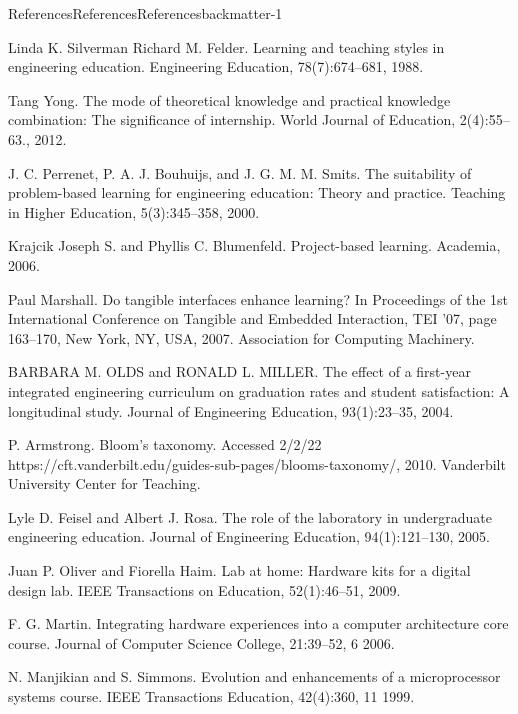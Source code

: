 \documentclass[oneside,10pt,]{book}
\numberwithin{equation}{section}
\begin{document}
\begin{references-chapter-numberless}{References}{References}{}{References}{}{}{backmatter-1}
\begin{referencelist}
\hypertarget{Learning-Styles}{}Linda K. Silverman Richard M. Felder. Learning and teaching styles in engineering education. Engineering Education, 78(7):674–681, 1988.%

\hypertarget{Yong}{}Tang Yong. The mode of theoretical knowledge and practical knowledge combination: The significance of internship. World Journal of Education, 2(4):55–63., 2012.%

\hypertarget{PBL1}{}J. C. Perrenet, P. A. J. Bouhuijs, and J. G. M. M. Smits. The suitability of problem-based learning for engineering education: Theory and practice. Teaching in Higher Education, 5(3):345–358, 2000.%

\hypertarget{PBL-Book}{}Krajcik Joseph S. and Phyllis C. Blumenfeld. Project-based learning. Academia, 2006.%

\hypertarget{TANGIBLEINTERFACES}{}Paul Marshall. Do tangible interfaces enhance learning? In Proceedings of the 1st International Conference on Tangible and Embedded Interaction, TEI ’07, page 163–170, New York, NY, USA, 2007. Association for Computing Machinery.%

\hypertarget{StudentSatisfaction}{}BARBARA M. OLDS and RONALD L. MILLER. The effect of a first-year integrated engineering curriculum on graduation rates and student satisfaction: A longitudinal study. Journal of Engineering Education, 93(1):23–35, 2004.%

\hypertarget{Armstrong}{}P. Armstrong. Bloom’s taxonomy. Accessed 2\slash{}2\slash{}22 https:\slash{}\slash{}cft.vanderbilt.edu\slash{}guides-sub-pages\slash{}blooms-taxonomy\slash{}, 2010. Vanderbilt University Center for Teaching.%

\hypertarget{Labs}{}Lyle D. Feisel and Albert J. Rosa. The role of the laboratory in undergraduate engineering education. Journal of Engineering Education, 94(1):121–130, 2005.%

\hypertarget{LabAtHome}{}Juan P. Oliver and Fiorella Haim. Lab at home: Hardware kits for a digital design lab. IEEE Transactions on Education, 52(1):46–51, 2009.%

\hypertarget{LabAtHome1}{}F. G. Martin. Integrating hardware experiences into a computer architecture core course. Journal of Computer Science College, 21:39–52, 6 2006.%

\hypertarget{LabAtHome2-EE}{}N. Manjikian and S. Simmons. Evolution and enhancements of a microprocessor systems course. IEEE Transactions Education, 42(4):360, 11 1999.%


\end{referencelist}
\end{references-chapter-numberless}
\end{document}
